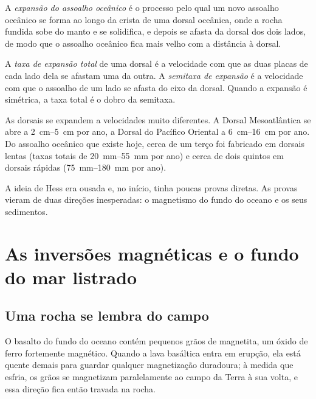 \begin{definition}\label{def:g11:drift-to-spreading:spreading}
A \emph{expansão do assoalho oceânico} é o processo pelo qual
um novo assoalho oceânico se forma ao longo da crista de uma dorsal
oceânica, onde a rocha fundida sobe do manto e se solidifica, e depois se
afasta da dorsal dos dois lados, de modo que o assoalho oceânico fica mais
velho com a distância à dorsal.
\end{definition}

\begin{definition}\label{def:g11:drift-to-spreading:spreading-rate}
A \emph{taxa de expansão total} de
uma dorsal é a velocidade com que as duas placas de cada lado dela se
afastam uma da outra. A \emph{semitaxa de expansão} é a velocidade com que o
assoalho de um lado se afasta do eixo da dorsal. Quando a expansão é
simétrica, a taxa total é o dobro da semitaxa.
\end{definition}

As dorsais se expandem a velocidades muito diferentes. A Dorsal
Mesoatlântica se abre a \qtyrange{2}{5}{cm} por ano, a Dorsal do Pacífico
Oriental a \qtyrange{6}{16}{cm} por ano. Do assoalho oceânico que existe
hoje, cerca de um terço foi fabricado em dorsais lentas (taxas totais de
\qtyrange{20}{55}{mm} por ano) e cerca de dois quintos em dorsais rápidas
(\qtyrange{75}{180}{mm} por ano).

A ideia de Hess era ousada e, no início, tinha poucas provas diretas. As
provas vieram de duas direções inesperadas: o magnetismo do fundo do oceano
e os seus sedimentos.

\section{As inversões magnéticas e o fundo do mar listrado}

\subsection{Uma rocha se lembra do campo}

O basalto do fundo do oceano contém pequenos grãos de magnetita, um óxido de
ferro fortemente magnético. Quando a lava basáltica entra em erupção, ela
está quente demais para guardar qualquer magnetização duradoura; à medida
que esfria, os grãos se magnetizam paralelamente ao campo da Terra à sua
volta, e essa direção fica então travada na rocha.

